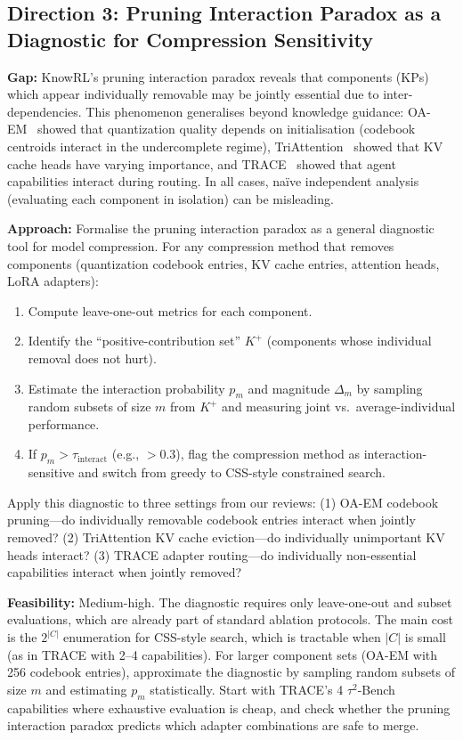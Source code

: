 \documentclass[11pt]{article}
\begin{document}
\subsection{Direction 3: Pruning Interaction Paradox as a Diagnostic for Compression Sensitivity}

\textbf{Gap:} KnowRL's pruning interaction paradox reveals that components (KPs) which appear individually removable may be jointly essential due to inter-dependencies. This phenomenon generalises beyond knowledge guidance: OA-EM~\cite{oaem} showed that quantization quality depends on initialisation (codebook centroids interact in the undercomplete regime), TriAttention~\cite{triattention} showed that KV cache heads have varying importance, and TRACE~\cite{trace} showed that agent capabilities interact during routing. In all cases, na\"ive independent analysis (evaluating each component in isolation) can be misleading.

\textbf{Approach:} Formalise the pruning interaction paradox as a general diagnostic tool for model compression. For any compression method that removes components (quantization codebook entries, KV cache entries, attention heads, LoRA adapters):
\begin{enumerate}
    \item Compute leave-one-out metrics for each component.
    \item Identify the ``positive-contribution set'' $K^{+}$ (components whose individual removal does not hurt).
    \item Estimate the interaction probability $p_m$ and magnitude $\Delta_m$ by sampling random subsets of size $m$ from $K^{+}$ and measuring joint vs.\ average-individual performance.
    \item If $p_m > \tau_{\mathrm{interact}}$ (e.g., $> 0.3$), flag the compression method as interaction-sensitive and switch from greedy to CSS-style constrained search.
\end{enumerate}

Apply this diagnostic to three settings from our reviews: (1) OA-EM codebook pruning---do individually removable codebook entries interact when jointly removed? (2) TriAttention KV cache eviction---do individually unimportant KV heads interact? (3) TRACE adapter routing---do individually non-essential capabilities interact when jointly removed?

\textbf{Feasibility:} Medium-high. The diagnostic requires only leave-one-out and subset evaluations, which are already part of standard ablation protocols. The main cost is the $2^{|C|}$ enumeration for CSS-style search, which is tractable when $|C|$ is small (as in TRACE with 2--4 capabilities). For larger component sets (OA-EM with 256 codebook entries), approximate the diagnostic by sampling random subsets of size $m$ and estimating $p_m$ statistically. Start with TRACE's 4 $\tau^{2}$-Bench capabilities where exhaustive evaluation is cheap, and check whether the pruning interaction paradox predicts which adapter combinations are safe to merge.
\end{document}
